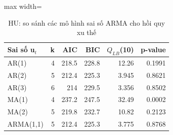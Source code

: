 \begin{table}[H]
\centering\footnotesize
\caption{HU: so sánh các mô hình sai số ARMA cho hồi quy xu thế}\label{tab:tab_b11_13_hu_models}
\begin{adjustbox}{max width=\linewidth}
\begin{tabular}{|l|r|r|r|r|r|}
\toprule
Sai số u$_{t}$ & k & AIC & BIC & $Q_{LB}$(10) & p-value \\
\midrule
AR(1) & 4 & 218.5 & 228.8 & 12.26 & 0.1991 \\
AR(2) & 5 & 212.4 & 225.3 & 3.945 & 0.8621 \\
AR(3) & 6 & 214 & 229.5 & 3.356 & 0.8502 \\
MA(1) & 4 & 237.2 & 247.5 & 32.49 & 0.0002 \\
MA(2) & 5 & 219.8 & 232.7 & 10.82 & 0.2123 \\
ARMA(1,1) & 5 & 212.4 & 225.3 & 3.775 & 0.8768 \\
\bottomrule
\end{tabular}
\end{adjustbox}\par{}
\end{table}
